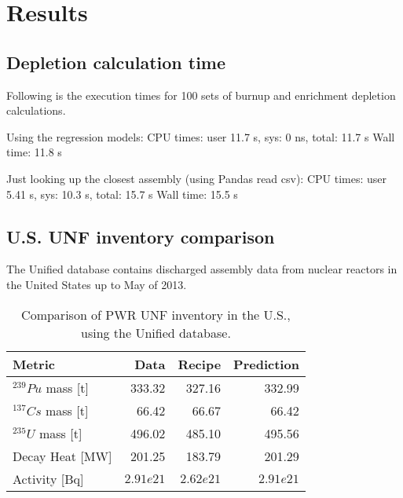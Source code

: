 \section{Results}


\subsection{Depletion calculation time}

Following is the execution times for 100 sets of
burnup and enrichment depletion calculations. 

Using the regression models:
CPU times: user 11.7 s, sys: 0 ns, total: 11.7 s
Wall time: 11.8 s


Just looking up the closest assembly (using Pandas read csv):
CPU times: user 5.41 s, sys: 10.3 s, total: 15.7 s
Wall time: 15.5 s

\subsection{U.S. \gls{UNF} inventory comparison}

The Unified database contains discharged assembly data
from nuclear reactors in the United States up to May of
2013. 


\begin{table}[h]
    \centering
    \begin{tabular}{lrrr}
        \hline
        Metric & Data & Recipe & Prediction \\
        \hline
        $^{239}Pu$ mass [t] & 333.32 & 327.16 & 332.99\\
        $^{137}Cs$ mass [t] & 66.42 & 66.67 & 66.42\\
        $^{235}U$ mass [t] & 496.02 & 485.10 & 495.56\\
        Decay Heat [MW] & 201.25 & 183.79 & 201.29 \\
        Activity [Bq] & $2.91e21$ & $2.62e21$ & $2.91e21$ \\
        \hline
    \end{tabular}
    \caption{Comparison of \gls{PWR} \gls{UNF} inventory in the U.S.,
             using the Unified database.}
\end{table}


